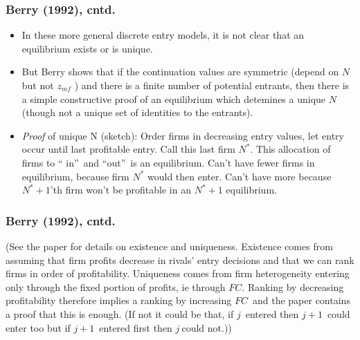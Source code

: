 \documentclass[aspectratio=169,11pt]{beamer}
\begin{document}
\begin{frame}

\frametitle{Berry (1992), cntd.}
\begin{itemize}
\item In these more general discrete entry models, it is not clear that an
equilibrium exists or is unique.

\item But Berry shows that if the continuation values are symmetric (depend
on $N$ but not $z_{mf}$ ) and there is a finite number of potential
entrants, then there is a simple constructive proof of an equilibrium which
detemines a unique $N$ (though not a unique set of identities to the
entrants).

\item \textit{Proof} of unique N (sketch): Order firms in decreasing entry
values, let entry occur until last profitable entry. Call this last firm $%
N^{\ast }$. This allocation of firms to \textquotedblleft
in\textquotedblright\ and \textquotedblleft out\textquotedblright\ is an
equilibrium. Can't have fewer firms in equilibrium, because firm $N^{\ast }$
would then enter. Can't have more because $N^{\ast }+1$'th firm won't be
profitable in an $N^{\ast }+1$ equilibrium.
\end{itemize}
\end{frame}

\begin{frame}
\frametitle{Berry (1992), cntd.}

{\small (See the paper for details on existence and uniqueness. Existence
comes from assuming that firm profits decrease in rivals' entry decisions
and that we can rank firms in order of profitability. Uniqueness comes from
firm heterogeneity entering only through the fixed portion of profits, ie
through }$FC${\small . Ranking by decreasing profitability therefore implies
a ranking by increasing }$FC${\small \ and the paper contains a proof that
this is enough. (If not it could be that, if }$j${\small \ entered then }$%
j+1 ${\small \ could enter too but if }$j+1${\small \ entered first then }$j~
${\small could not.))}
\end{frame}
\end{document}
